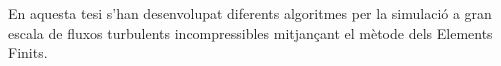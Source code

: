 %
%
%
%


En aquesta tesi s'han desenvolupat diferents algoritmes per la simulació a gran escala de fluxos turbulents incompressibles mitjançant el mètode dels Elements Finits.

